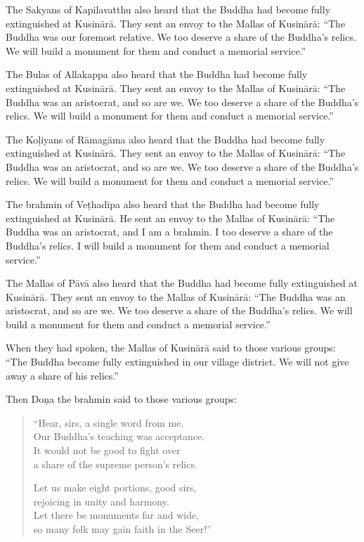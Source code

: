 \documentclass[12pt,openany]{book}%
\begin{document}
The Sakyans of Kapilavatthu also heard that the Buddha had become fully extinguished at \textsanskrit{Kusinārā}. They sent an envoy to the Mallas of \textsanskrit{Kusinārā}: “The Buddha was our foremost relative. We too deserve a share of the Buddha’s relics. We will build a monument for them and conduct a memorial service.” 

The Bulas of Allakappa also heard that the Buddha had become fully extinguished at \textsanskrit{Kusinārā}. They sent an envoy to the Mallas of \textsanskrit{Kusinārā}: “The Buddha was an aristocrat, and so are we. We too deserve a share of the Buddha’s relics. We will build a monument for them and conduct a memorial service.” 

The \textsanskrit{Koḷiyans} of \textsanskrit{Rāmagāma} also heard that the Buddha had become fully extinguished at \textsanskrit{Kusinārā}. They sent an envoy to the Mallas of \textsanskrit{Kusinārā}: “The Buddha was an aristocrat, and so are we. We too deserve a share of the Buddha’s relics. We will build a monument for them and conduct a memorial service.” 

The brahmin of \textsanskrit{Veṭhadīpa} also heard that the Buddha had become fully extinguished at \textsanskrit{Kusinārā}. He sent an envoy to the Mallas of \textsanskrit{Kusinārā}: “The Buddha was an aristocrat, and I am a brahmin. I too deserve a share of the Buddha’s relics. I will build a monument for them and conduct a memorial service.” 

The Mallas of \textsanskrit{Pāvā} also heard that the Buddha had become fully extinguished at \textsanskrit{Kusinārā}. They sent an envoy to the Mallas of \textsanskrit{Kusinārā}: “The Buddha was an aristocrat, and so are we. We too deserve a share of the Buddha’s relics. We will build a monument for them and conduct a memorial service.” 

When they had spoken, the Mallas of \textsanskrit{Kusinārā} said to those various groups: “The Buddha became fully extinguished in our village district. We will not give away a share of his relics.” 

Then \textsanskrit{Doṇa} the brahmin said to those various groups: 

\begin{verse}%
“Hear, sirs, a single word from me. \\
Our Buddha’s teaching was acceptance. \\
It would not be good to fight over \\
a share of the supreme person’s relics. 

Let us make eight portions, good sirs, \\
rejoicing in unity and harmony. \\
Let there be monuments far and wide, \\
so many folk may gain faith in the Seer!” 

%
\end{verse}
\end{document}
